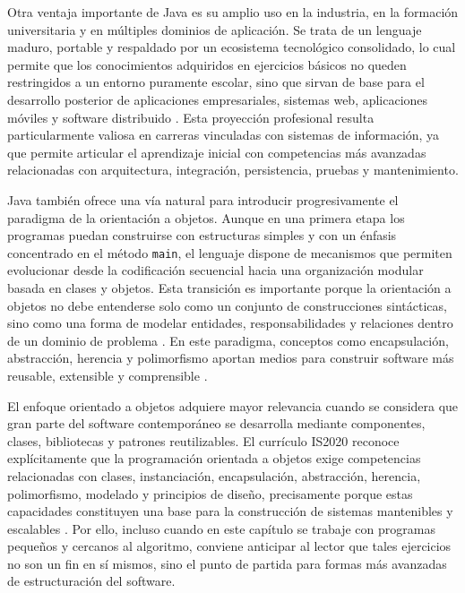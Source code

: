\documentclass[12pt,twoside]{book}
\begin{document}
			Otra ventaja importante de Java es su amplio uso en la industria, en la formación universitaria y en múltiples dominios de aplicación. Se trata de un lenguaje maduro, portable y respaldado por un ecosistema tecnológico consolidado, lo cual permite que los conocimientos adquiridos en ejercicios básicos no queden restringidos a un entorno puramente escolar, sino que sirvan de base para el desarrollo posterior de aplicaciones empresariales, sistemas web, aplicaciones móviles y software distribuido \cite{Deitel2025Java,Leidig2021Competency,SWEBOK2025Guide}. Esta proyección profesional resulta particularmente valiosa en carreras vinculadas con sistemas de información, ya que permite articular el aprendizaje inicial con competencias más avanzadas relacionadas con arquitectura, integración, persistencia, pruebas y mantenimiento.
			
			Java también ofrece una vía natural para introducir progresivamente el paradigma de la orientación a objetos. Aunque en una primera etapa los programas puedan construirse con estructuras simples y con un énfasis concentrado en el método \texttt{main}, el lenguaje dispone de mecanismos que permiten evolucionar desde la codificación secuencial hacia una organización modular basada en clases y objetos. Esta transición es importante porque la orientación a objetos no debe entenderse solo como un conjunto de construcciones sintácticas, sino como una forma de modelar entidades, responsabilidades y relaciones dentro de un dominio de problema \cite{Booch2007OOAD,Tegarden2025Systems,Leidig2021Competency}. En este paradigma, conceptos como encapsulación, abstracción, herencia y polimorfismo aportan medios para construir software más reusable, extensible y comprensible \cite{Leidig2021Competency,Halterman2018Fundamentals}.
			
			El enfoque orientado a objetos adquiere mayor relevancia cuando se considera que gran parte del software contemporáneo se desarrolla mediante componentes, clases, bibliotecas y patrones reutilizables. El currículo IS2020 reconoce explícitamente que la programación orientada a objetos exige competencias relacionadas con clases, instanciación, encapsulación, abstracción, herencia, polimorfismo, modelado y principios de diseño, precisamente porque estas capacidades constituyen una base para la construcción de sistemas mantenibles y escalables \cite{Leidig2021Competency}. Por ello, incluso cuando en este capítulo se trabaje con programas pequeños y cercanos al algoritmo, conviene anticipar al lector que tales ejercicios no son un fin en sí mismos, sino el punto de partida para formas más avanzadas de estructuración del software.
			
\end{document}
